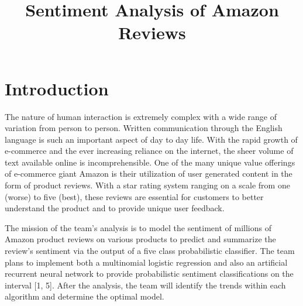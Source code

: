 \documentclass[conference]{IEEEtran}
\begin{document}
\title{Sentiment Analysis of Amazon Reviews}

\author{
\and
{}
\and
{}
}

\maketitle

\section{Introduction}
The nature of human interaction is extremely complex with a wide range of variation from person to person. Written communication through the English language is such an important aspect of day to day life. With the rapid growth of e-commerce and the ever increasing reliance on the internet, the sheer volume of text available online is incomprehensible. One of the many unique value offerings of e-commerce giant Amazon is their utilization of user generated content in the form of product reviews. With a star rating system ranging on a scale from one (worse) to five (best), these reviews are essential for customers to better understand the product and to provide unique user feedback. 

The mission of the team’s analysis is to model the sentiment of millions of  Amazon product reviews on various products to predict and summarize the review’s sentiment via the output of a five class probabilistic classifier. The team plans to implement both a multinomial logistic regression and also an artificial recurrent neural network to provide probabilistic sentiment classifications on the interval [1, 5]. After the analysis, the team will identify the trends within each algorithm and determine the optimal model.  
\end{document}
